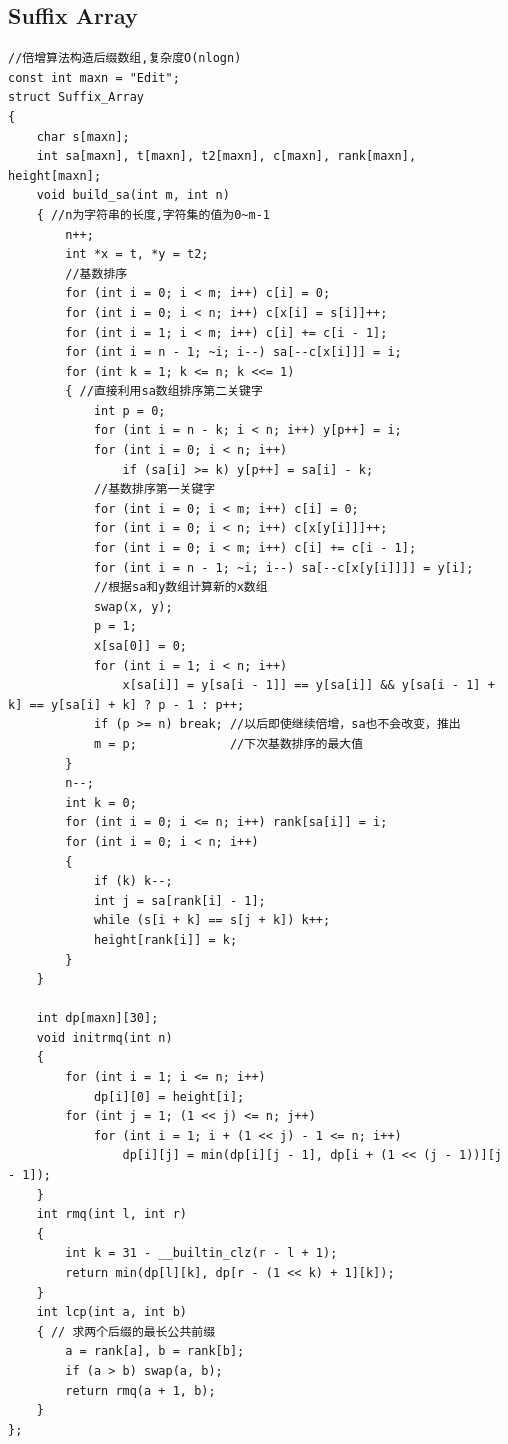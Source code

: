 \documentclass[twoside]{article}
\begin{document}
\subsection{Suffix Array}
\begin{lstlisting}
//倍增算法构造后缀数组,复杂度O(nlogn)
const int maxn = "Edit";
struct Suffix_Array
{
    char s[maxn];
    int sa[maxn], t[maxn], t2[maxn], c[maxn], rank[maxn], height[maxn];
    void build_sa(int m, int n)
    { //n为字符串的长度,字符集的值为0~m-1
        n++;
        int *x = t, *y = t2;
        //基数排序
        for (int i = 0; i < m; i++) c[i] = 0;
        for (int i = 0; i < n; i++) c[x[i] = s[i]]++;
        for (int i = 1; i < m; i++) c[i] += c[i - 1];
        for (int i = n - 1; ~i; i--) sa[--c[x[i]]] = i;
        for (int k = 1; k <= n; k <<= 1)
        { //直接利用sa数组排序第二关键字
            int p = 0;
            for (int i = n - k; i < n; i++) y[p++] = i;
            for (int i = 0; i < n; i++)
                if (sa[i] >= k) y[p++] = sa[i] - k;
            //基数排序第一关键字
            for (int i = 0; i < m; i++) c[i] = 0;
            for (int i = 0; i < n; i++) c[x[y[i]]]++;
            for (int i = 0; i < m; i++) c[i] += c[i - 1];
            for (int i = n - 1; ~i; i--) sa[--c[x[y[i]]]] = y[i];
            //根据sa和y数组计算新的x数组
            swap(x, y);
            p = 1;
            x[sa[0]] = 0;
            for (int i = 1; i < n; i++)
                x[sa[i]] = y[sa[i - 1]] == y[sa[i]] && y[sa[i - 1] + k] == y[sa[i] + k] ? p - 1 : p++;
            if (p >= n) break; //以后即使继续倍增，sa也不会改变，推出
            m = p;             //下次基数排序的最大值
        }
        n--;
        int k = 0;
        for (int i = 0; i <= n; i++) rank[sa[i]] = i;
        for (int i = 0; i < n; i++)
        {
            if (k) k--;
            int j = sa[rank[i] - 1];
            while (s[i + k] == s[j + k]) k++;
            height[rank[i]] = k;
        }
    }
    
    int dp[maxn][30];
    void initrmq(int n)
    {
        for (int i = 1; i <= n; i++)
            dp[i][0] = height[i];
        for (int j = 1; (1 << j) <= n; j++)
            for (int i = 1; i + (1 << j) - 1 <= n; i++)
                dp[i][j] = min(dp[i][j - 1], dp[i + (1 << (j - 1))][j - 1]);
    }
    int rmq(int l, int r)
    {
        int k = 31 - __builtin_clz(r - l + 1);
        return min(dp[l][k], dp[r - (1 << k) + 1][k]);
    }
    int lcp(int a, int b)
    { // 求两个后缀的最长公共前缀
        a = rank[a], b = rank[b];
        if (a > b) swap(a, b);
        return rmq(a + 1, b);
    }
};\end{lstlisting}
\end{document}
